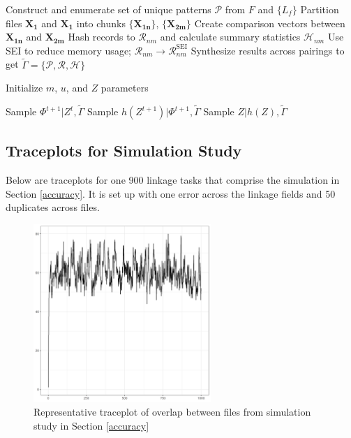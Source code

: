 \documentclass[12pt,letterpaper]{article}
\newcommand{\1}[1]{\mathbb{I}\!\left[#1\right]} %
\begin{document}
\begin{algorithm}[h!]
	\begin{algorithmic}[1]
		
		\State Construct and enumerate set of unique patterns $\mathcal{P}$ from $F$ and $\{L_f\}$
		\State Partition files $\bm{X_1}$ and $\bm{X_1}$ into chunks $\{\bm{X_{1n}}\}$, $\{\bm{X_{2m}}\}$
		\State Create comparison vectors between $\bm{X_{1n}}$ and $\bm{X_{2m}}$
		\State Hash records to $\mathcal{R}_{nm}$ and calculate summary statistics $\mathcal{H}_{nm}$
		\State Use SEI to reduce memory usage; $\mathcal{R}_{nm} \to \mathcal{R}_{nm}^{\text{SEI}}$
		\EndFor
		\State Synthesize results across pairings to get $\tilde{\Gamma} = \{\mathcal{P}, \mathcal{R}, \mathcal{H} \}$
		\EndProcedure
		
		\State Initialize $m$, $u$, and $Z$ parameters
		
		\State Sample $\Phi^{t+1}|Z^{t}, \tilde{\Gamma}$
		\State Sample $h\left(Z^{t+1}\right)|\Phi^{t+1}, \tilde{\Gamma}$  
		\EndFor
		\State Sample $Z | h(Z), \tilde{\Gamma}$ 
		
		\EndProcedure
		
	\end{algorithmic}
\end{algorithm}
\clearpage

\hypertarget{appendix-sim}{%
	\subsection{Traceplots for Simulation Study}\label{app:appendix-sim}}
Below are traceplots for one 900 linkage tasks that comprise the simulation in Section \ref{accuracy}. It is set up with one error across the linkage fields and 50 duplicates across files. 

\begin{figure}[!h]
	\begin{center}
		\includegraphics[width=0.6\textwidth]{../notes/figures/sim_overlap_trace} 
		\caption{Representative traceplot of overlap between files from simulation study in Section \ref{accuracy}}\label{fig:sim_overlap_trace}
	\end{center}
\end{figure}
\end{document}
